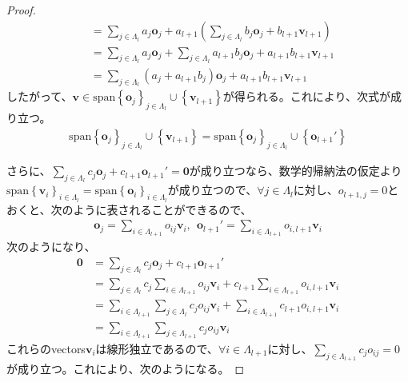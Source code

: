\documentclass[dvipdfmx]{jsarticle}
\begin{document}
\begin{proof}
\begin{align*}
&= \sum_{j \in \varLambda_{l}} {a_{j}\mathbf{o}_{j}} + a_{l + 1}\left( \sum_{j \in \varLambda_{l}} {b_{j}\mathbf{o}_{j}} + b_{l + 1}\mathbf{v}_{l + 1} \right)\\
&= \sum_{j \in \varLambda_{l}} {a_{j}\mathbf{o}_{j}} + \sum_{j \in \varLambda_{l}} {a_{l + 1}b_{j}\mathbf{o}_{j}} + a_{l + 1}b_{l + 1}\mathbf{v}_{l + 1}\\
&= \sum_{j \in \varLambda_{l}} {\left( a_{j} + a_{l + 1}b_{j} \right)\mathbf{o}_{j}} + a_{l + 1}b_{l + 1}\mathbf{v}_{l + 1}
\end{align*}
したがって、$\mathbf{v} \in \mathrm{span}{\left\{ \mathbf{o}_{j} \right\}_{j \in \varLambda_{l}} \cup \left\{ \mathbf{v}_{l + 1} \right\}}$が得られる。これにより、次式が成り立つ。
\begin{align*}
\mathrm{span}{\left\{ \mathbf{o}_{j} \right\}_{j \in \varLambda_{l}} \cup \left\{ \mathbf{v}_{l + 1} \right\}} = \mathrm{span}{\left\{ \mathbf{o}_{j} \right\}_{j \in \varLambda_{l}} \cup \left\{ \mathbf{o}_{l + 1}' \right\}}
\end{align*}\par
さらに、$\sum_{j \in \varLambda_{l}} {c_{j}\mathbf{o}_{j}} + c_{l + 1}\mathbf{o}_{l + 1}' = \mathbf{0}$が成り立つなら、数学的帰納法の仮定より$\mathrm{span}\left\{ \mathbf{v}_{i} \right\}_{i \in \varLambda_{l}} = \mathrm{span}\left\{ \mathbf{o}_{i} \right\}_{i \in \varLambda_{l}}$が成り立つので、$\forall j \in \varLambda_{l}$に対し、$o_{l + 1,j} = 0$とおくと、次のように表されることができるので、
\begin{align*}
\mathbf{o}_{j} = \sum_{i \in \varLambda_{l + 1}} {o_{ij}\mathbf{v}_{i}},\ \ \mathbf{o}_{l + 1}' = \sum_{i \in \varLambda_{l + 1}} {o_{i,l + 1}\mathbf{v}_{i}}
\end{align*}
次のようになり、
\begin{align*}
\mathbf{0} &= \sum_{j \in \varLambda_{l}} {c_{j}\mathbf{o}_{j}} + c_{l + 1}\mathbf{o}_{l + 1}'\\
&= \sum_{j \in \varLambda_{l}} {c_{j}\sum_{i \in \varLambda_{l + 1}} {o_{ij}\mathbf{v}_{i}}} + c_{l + 1}\sum_{i \in \varLambda_{l + 1}} {o_{i,l + 1}\mathbf{v}_{i}}\\
&= \sum_{i \in \varLambda_{l + 1}} {\sum_{j \in \varLambda_{l}} {c_{j}o_{ij}\mathbf{v}_{i}}} + \sum_{i \in \varLambda_{l + 1}} {c_{l + 1}o_{i,l + 1}\mathbf{v}_{i}}\\
&= \sum_{i \in \varLambda_{l + 1}} {\sum_{j \in \varLambda_{l + 1}} {c_{j}o_{ij}\mathbf{v}_{i}}}
\end{align*}
これらのvectors$\mathbf{v}_{i}$は線形独立であるので、$\forall i \in \varLambda_{l + 1}$に対し、$\sum_{j \in \varLambda_{l + 1}} {c_{j}o_{ij}} = 0$が成り立つ。これにより、次のようになる。

\end{proof}
\end{document}
